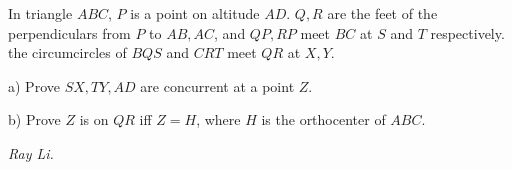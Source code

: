 In triangle $ABC$, $P$ is a point on altitude $AD$. $Q,R$ are the feet of the perpendiculars from $P$ to $AB,AC$, and $QP,RP$ meet $BC$ at $S$ and $T$ respectively. the circumcircles of $BQS$ and $CRT$ meet $QR$ at $X,Y$.

a) Prove $SX,TY, AD$ are concurrent at a point $Z$.

b) Prove $Z$ is on $QR$ iff $Z=H$, where $H$ is the orthocenter of $ABC$.

\textit{Ray Li.}